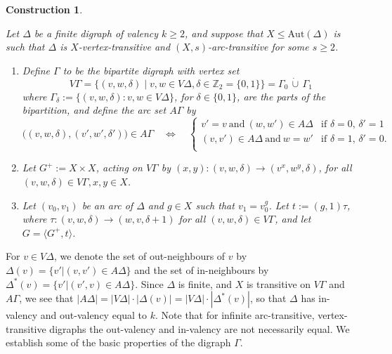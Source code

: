 \documentclass[11pt]{amsart}
\newtheorem{construction}[theorem]{Construction}
\newcommand{\Aut}{\mathrm{Aut}}
\begin{document}
{\color{purple}

}  



\begin{construction}\label{con1}
{\rm
    Let $\Delta$ be a finite digraph of valency $k\geqslant2$, %
    and suppose that $X\leq \Aut(\Delta)$ is such that $\Delta$ is $X$-vertex-transitive and $(X,s)$-arc-transitive for some $s\geqslant2$. 
    \begin{enumerate}
    \item[(a)]   Define $\Gamma$ to be the bipartite digraph with vertex set 
        \[
    V\Gamma = \{ (v,w,\delta) \mid v,w\in V\Delta, \delta\in \mathbb{Z}_2=\{0,1\}\} = \Gamma_0\,\dot\cup\,\Gamma_1
    \]
    where  \(\Gamma_\delta:=\{(v,w,\delta):v,w\in V\Delta\}\), for \(\delta\in\{0,1\}\), are the parts of the bipartition, 
    and define the arc set $A\Gamma$ by
    \[
    \big((v,w,\delta),(v',w',\delta')\big)\in A\Gamma\quad \Longleftrightarrow\quad 
    \begin{cases}
       v'=v \ \mbox{and} \ (w,w')\in A\Delta  &\mbox{if $\delta=0$, $\delta'=1$}\\
       (v,v')\in A\Delta \ \mbox{and} \  w=w'  &\mbox{if $\delta=1$, $\delta'=0$.}\\  
    \end{cases} 
    \]
    \item[(b)] Let $G^+:=X\times X$, acting on $V\Gamma$ by $(x,y):(v,w,\delta)\to (v^x,w^y,\delta)$, for all $(v,w,\delta)\in V\Gamma, x,y\in X$.  
    
     \item[(c)] Let $(v_0,v_1)$ be an arc  of $\Delta$ and $g\in X$  such that $v_1=v_0^g$. 
   Let $t := (g,1)\tau$, where $\tau:(v,w,\delta)\to (w,v,\delta+1)$ for all $(v,w,\delta)\in V\Gamma$, and let $G=\langle G^+, t\rangle$. 
    \end{enumerate}
}
\end{construction}

For $v\in V\Delta$, we denote the set of out-neighbours of $v$ by $\Delta(v)=\{ v'|(v,v')\in A\Delta\}$ and the set of in-neighbours by  $\Delta^*(v)=\{ v'|(v',v)\in A\Delta\}$. Since $\Delta$ is finite, and $X$ is transitive on $V\Gamma$ and $A\Gamma$, we see that $|A\Delta|=|V\Delta|\cdot |\Delta(v)| = |V\Delta|\cdot |\Delta^*(v)|$, so that $\Delta$ has in-valency and out-valency  equal to $k$. Note that for infinite arc-transitive, vertex-transitive digraphs the out-valency and in-valency are not necessarily equal. We establish some of the basic properties of the digraph $\Gamma$.
\end{document}
